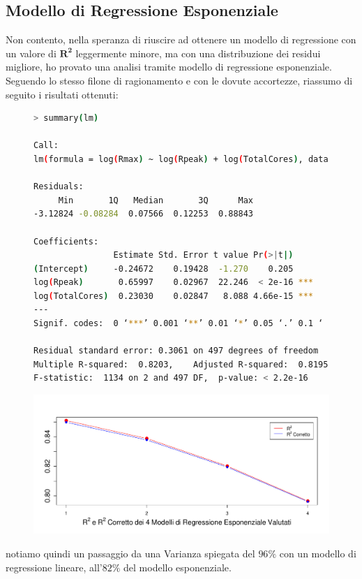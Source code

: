 \documentclass[11pt,a4paper]{article}
\begin{document}
\subsection{Modello di Regressione Esponenziale}
Non contento, nella speranza di riuscire ad ottenere un modello di regressione
con un valore di $\boldsymbol{R^2}$ leggermente minore, ma con una distribuzione
dei residui migliore, ho provato una analisi tramite modello di regressione
esponenziale. Seguendo lo stesso filone di ragionamento e con le dovute
accortezze, riassumo di seguito i risultati ottenuti:
\begin{figure}[h]
	\hspace{-2.15cm}
	\begin{minipage}{.6\textwidth} 
		\begin{lstlisting}[language=bash,basicstyle=\tiny,tabsize=2,frame = single]
> summary(lm)

Call:
lm(formula = log(Rmax) ~ log(Rpeak) + log(TotalCores), data = data)

Residuals:
     Min       1Q   Median       3Q      Max 
-3.12824 -0.08284  0.07566  0.12253  0.88843 

Coefficients:
                Estimate Std. Error t value Pr(>|t|)    
(Intercept)     -0.24672    0.19428  -1.270    0.205    
log(Rpeak)       0.65997    0.02967  22.246  < 2e-16 ***
log(TotalCores)  0.23030    0.02847   8.088 4.66e-15 ***
---
Signif. codes:  0 ‘***’ 0.001 ‘**’ 0.01 ‘*’ 0.05 ‘.’ 0.1 ‘ ’ 1

Residual standard error: 0.3061 on 497 degrees of freedom
Multiple R-squared:  0.8203,	Adjusted R-squared:  0.8195 
F-statistic:  1134 on 2 and 497 DF,  p-value: < 2.2e-16
		\end{lstlisting}
	\end{minipage}
	\begin{minipage}{0.5\textwidth} 
		\includegraphics[scale=.4]{imgs/r_squared_exp.pdf}
	\end{minipage}
\end{figure}
notiamo quindi un passaggio da una Varianza spiegata del $96\%$ con un modello
di regressione lineare, all'$82\%$ del modello esponenziale.
\end{document}
